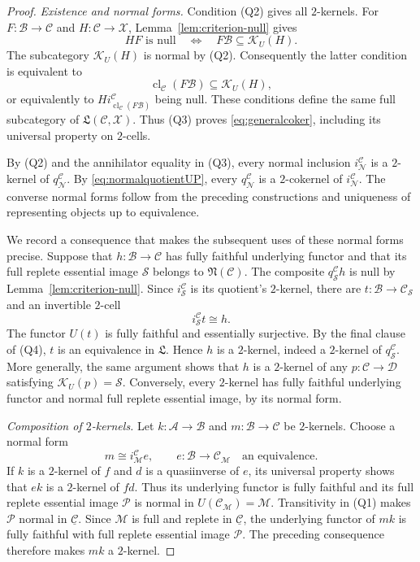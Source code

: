 \documentclass[11pt,reqno,a4paper]{amsart}
\theoremstyle{definition}
\theoremstyle{remark}
\newcommand{\A}{\mathcal{A}}
\newcommand{\C}{\mathcal{C}}
\newcommand{\D}{\mathcal{D}}
\newcommand{\M}{\mathcal{M}}
\newcommand{\N}{\mathcal{N}}
\newcommand{\0}{\mathbf{0}}
\renewcommand{\1}{\mathbf{1}}
\newcommand{\iso}{\cong}
\newcommand{\Lcat}{\mathfrak L}
\newcommand{\B}{\mathcal B}
\newcommand{\Pcal}{\mathcal P}
\newcommand{\Scl}{\mathcal S}
\newcommand{\X}{\mathcal X}
\DeclareMathOperator{\cl}{cl}
\begin{document}
\begin{proof}
\emph{Existence and normal forms.}
Condition (Q2) gives all $2$-kernels. For $F:\B\to\C$ and
$H:\C\to\X$, Lemma~\ref{lem:criterion-null} gives
\[
 HF\text{ is null}
 \quad\Longleftrightarrow\quad
 F\B\subseteq\mathcal{K}_U(H).
\]
The subcategory $\mathcal{K}_U(H)$ is normal by (Q2).
Consequently the latter condition is equivalent to
\[
 \cl_{\C}(F\B)\subseteq\mathcal{K}_U(H),
\]
or equivalently to
$H i_{\cl_{\C}(F\B)}^{\C}$ being null.
These conditions define the same full subcategory of
$\Lcat(\C,\X)$. Thus (Q3) proves
\eqref{eq:generalcoker}, including its universal property on
$2$-cells.

By (Q2) and the annihilator equality in (Q3), every normal
inclusion $i_{\N}^{\C}$ is a $2$-kernel of $q_{\N}^{\C}$.
By \eqref{eq:normalquotientUP}, every $q_{\N}^{\C}$ is a
$2$-cokernel of $i_{\N}^{\C}$. The converse normal forms follow
from the preceding constructions and uniqueness of representing
objects up to equivalence.

We record a consequence that makes the subsequent uses of these
normal forms precise. Suppose that $h:\B\to\C$ has fully
faithful underlying functor and that its full replete essential
image $\Scl$ belongs to $\mathfrak{N}(\C)$. The composite
$q_{\Scl}^{\C}h$ is null by Lemma~\ref{lem:criterion-null}.
Since $i_{\Scl}^{\C}$ is its quotient's $2$-kernel, there are
$t:\B\to\C_{\Scl}$ and an invertible $2$-cell
\[
 i_{\Scl}^{\C}t\iso h.
\]
The functor $U(t)$ is fully faithful and essentially surjective.
By the final clause of (Q4), $t$ is an equivalence in $\Lcat$.
Hence $h$ is a $2$-kernel, indeed a $2$-kernel of
$q_{\Scl}^{\C}$. More generally, the same argument shows that
$h$ is a $2$-kernel of any $p:\C\to\D$ satisfying
$\mathcal{K}_U(p)=\Scl$.
Conversely, every $2$-kernel has fully faithful underlying functor
and normal full replete essential image, by its normal form.

\emph{Composition of $2$-kernels.}
Let $k:\A\to\B$ and $m:\B\to\C$ be $2$-kernels.
Choose a normal form
\[
 m\iso i_{\M}^{\C}e,
 \qquad e:\B\longrightarrow\C_{\M}
 \quad\text{an equivalence}.
\]
If $k$ is a $2$-kernel of $f$ and $d$ is a quasiinverse of $e$,
its universal property shows that $ek$ is a $2$-kernel of $fd$.
Thus its underlying functor is fully faithful
and its full replete essential image $\Pcal$ is normal in
$U(\C_{\M})=\M$. Transitivity in (Q1) makes $\Pcal$ normal
in $\underline{\C}$. Since $\M$ is full and replete in
$\underline{\C}$, the underlying functor of $mk$ is fully faithful
with full replete essential image $\Pcal$. The preceding
consequence therefore makes $mk$ a $2$-kernel.


\end{proof}
\end{document}
